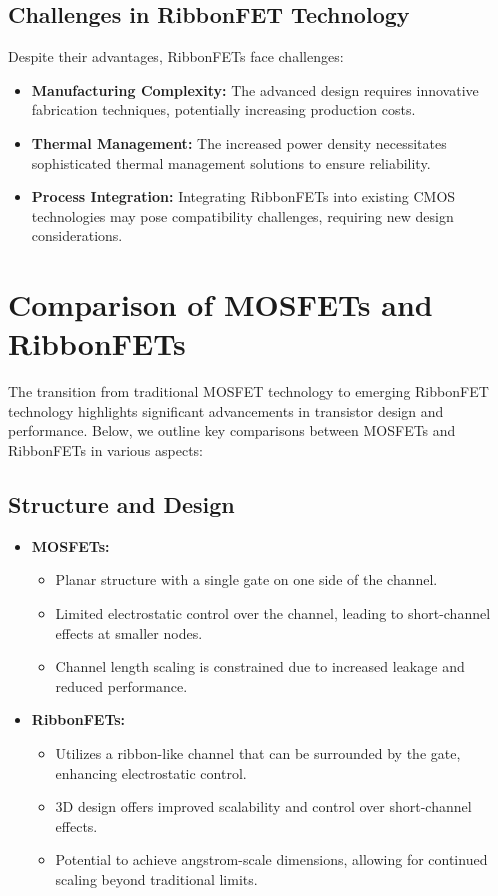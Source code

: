 \documentclass[12pt]{report}
\begin{document}
\begin{titlepage}
\subsection{Challenges in RibbonFET Technology}
Despite their advantages, RibbonFETs face challenges:
\begin{itemize}
    \item \textbf{Manufacturing Complexity:} The advanced design requires innovative fabrication techniques, potentially increasing production costs.
    \item \textbf{Thermal Management:} The increased power density necessitates sophisticated thermal management solutions to ensure reliability.
    \item \textbf{Process Integration:} Integrating RibbonFETs into existing CMOS technologies may pose compatibility challenges, requiring new design considerations.
\end{itemize}
\section{Comparison of MOSFETs and RibbonFETs}

The transition from traditional MOSFET technology to emerging RibbonFET technology highlights significant advancements in transistor design and performance. Below, we outline key comparisons between MOSFETs and RibbonFETs in various aspects:

\subsection{Structure and Design}

\begin{itemize}
    \item \textbf{MOSFETs:} 
    \begin{itemize}
        \item Planar structure with a single gate on one side of the channel.
        \item Limited electrostatic control over the channel, leading to short-channel effects at smaller nodes.
        \item Channel length scaling is constrained due to increased leakage and reduced performance.
    \end{itemize}
    
    \item \textbf{RibbonFETs:} 
    \begin{itemize}
        \item Utilizes a ribbon-like channel that can be surrounded by the gate, enhancing electrostatic control.
        \item 3D design offers improved scalability and control over short-channel effects.
        \item Potential to achieve angstrom-scale dimensions, allowing for continued scaling beyond traditional limits.
    \end{itemize}
\end{itemize}


\end{titlepage}
\end{document}
